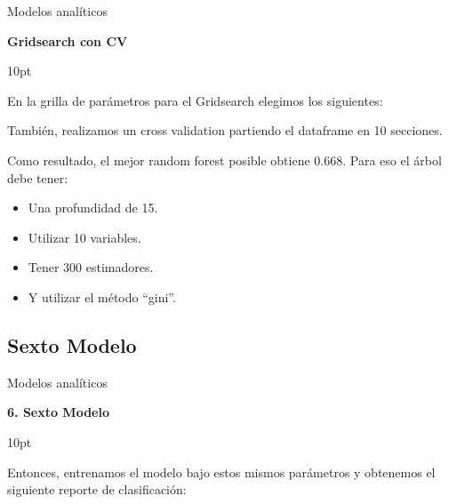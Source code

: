 \documentclass[pdf]{beamer}
\def\vspace{}%
\begin{document}
{\begin{frame}{Modelos analíticos}

    \begin{Large}
        \textbf{Gridsearch con CV}
    \end{Large}
    \vspace{10pt}

    En la grilla de parámetros para el Gridsearch elegimos los siguientes:
    \begin{itemize}
    \end{itemize}
    
    También, realizamos un cross validation partiendo el dataframe en 10 secciones.

    Como resultado, el mejor random forest posible obtiene 0.668. Para eso el árbol debe tener: 
    \begin{itemize}
        \item Una profundidad de 15.
        \item Utilizar  10  variables.
        \item Tener  300  estimadores.
        \item Y utilizar el método ``gini''.
    \end{itemize}

\end{frame}

    \subsection{Sexto Modelo}

\begin{frame}{Modelos analíticos}    

    \begin{Large}
        \textbf{6. Sexto Modelo}
    \end{Large}
    \vspace{10pt}

    Entonces, entrenamos el modelo bajo estos mismos parámetros y obtenemos el siguiente reporte de clasificación:
    

\end{frame}}
\end{document}

